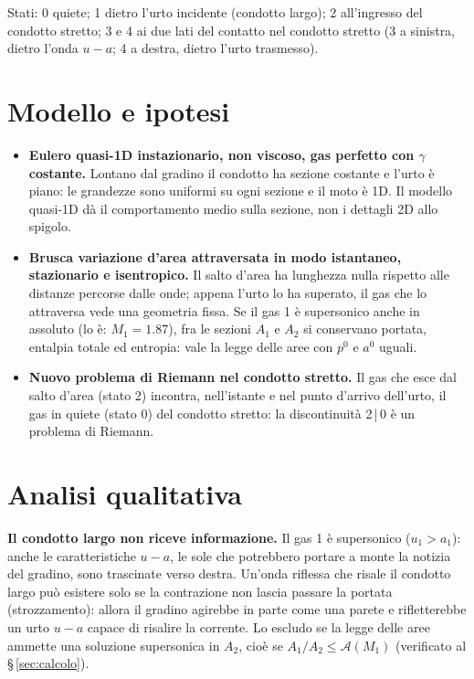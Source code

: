\documentclass[11pt,a4paper]{article}
\newcommand{\uma}{u-a}
\newcommand{\Ar}{\mathcal{A}}
\begin{document}
Stati: 0 quiete; 1 dietro l'urto incidente (condotto largo); 2 all'ingresso del condotto stretto; 3 e 4 ai due
lati del contatto nel condotto stretto (3 a sinistra, dietro l'onda $\uma$; 4 a destra, dietro l'urto trasmesso).

\section{Modello e ipotesi}
\begin{itemize}
  \item \textbf{Eulero quasi-1D instazionario, non viscoso, gas perfetto con $\gamma$ costante.} Lontano dal
    gradino il condotto ha sezione costante e l'urto è piano: le grandezze sono uniformi su ogni sezione e il
    moto è 1D. Il modello quasi-1D dà il comportamento medio sulla sezione, non i dettagli 2D allo spigolo.
  \item \textbf{Brusca variazione d'area attraversata in modo istantaneo, stazionario e isentropico.} Il salto
    d'area ha lunghezza nulla rispetto alle distanze percorse dalle onde; appena l'urto lo ha superato, il gas
    che lo attraversa vede una geometria fissa. Se il gas 1 è supersonico anche in assoluto (lo è:
    $M_1=\num{1.87}$), fra le sezioni $A_1$ e $A_2$ si conservano portata, entalpia totale ed entropia: vale
    la legge delle aree con $p^0$ e $a^0$ uguali.
  \item \textbf{Nuovo problema di Riemann nel condotto stretto.} Il gas che esce dal salto d'area (stato 2)
    incontra, nell'istante e nel punto d'arrivo dell'urto, il gas in quiete (stato 0) del condotto stretto: la
    discontinuità 2\,|\,0 è un problema di Riemann.
\end{itemize}

\section{Analisi qualitativa}
\textbf{Il condotto largo non riceve informazione.} Il gas 1 è supersonico ($u_1>a_1$): anche le
caratteristiche $\uma$, le sole che potrebbero portare a monte la notizia del gradino, sono trascinate verso
destra. Un'onda riflessa che risale il condotto largo può esistere solo se la contrazione non lascia passare
la portata (strozzamento): allora il gradino agirebbe in parte come una parete e rifletterebbe un urto $\uma$
capace di risalire la corrente. Lo escludo se la legge delle aree ammette una soluzione supersonica in $A_2$,
cioè se $A_1/A_2\le\Ar(M_1)$ (verificato al \S\,\ref{sec:calcolo}).
\end{document}
